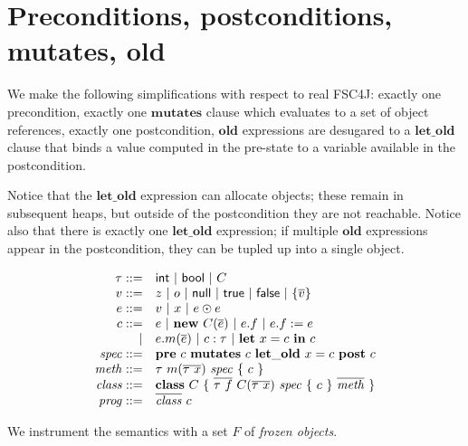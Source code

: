 \documentclass{article}
\newcommand{\op}{\odot}
\begin{document}
\section{Preconditions, postconditions, mutates, old}

We make the following simplifications with respect to real FSC4J: exactly one precondition, exactly one $\mathbf{mutates}$ clause which evaluates to a set of object references, exactly one postcondition, $\mathbf{old}$ expressions are desugared to a $\mathbf{let\_old}$ clause that binds a value computed in the pre-state to a variable available in the postcondition.

Notice that the $\mathbf{let\_old}$ expression can allocate objects; these remain in subsequent heaps, but outside of the postcondition they are not reachable. Notice also that there is exactly one $\mathbf{let\_old}$ expression; if multiple $\mathbf{old}$ expressions appear in the postcondition, they can be tupled up into a single object.

$$\begin{array}{r l}
\tau ::= & \mathsf{int}\ |\ \mathsf{bool}\ |\ C\\
v ::= & z\ |\ o\ |\ \mathsf{null}\ |\ \mathsf{true}\ |\ \mathsf{false}\ |\ \{\overline{v}\}\\
e ::= & v\ |\ x\ |\ e \op e\\
c ::= & e\ |\ \mathbf{new}\ C(\overline{e})\ |\ e.f\ |\ e.f := e\\
| & e.m(\overline{e})\ |\ c : \tau\ |\ \mathbf{let}\ x = c\ \mathbf{in}\ c\\
\mathit{spec} ::= & \mathbf{pre}\ c\ \mathbf{mutates}\ c\ \mathbf{let\_old}\ x = c\ \mathbf{post}\ c\\
\mathit{meth} ::= & \tau\ m(\overline{\tau\ x})\ \mathit{spec}\ \{\ c\ \}\\
\mathit{class} ::= & \mathbf{class}\ C\ \{\ \overline{\tau\ f}\ C(\overline{\tau\ x})\ \mathit{spec}\ \{\ c\ \}\ \overline{\mathit{meth}}\ \}\\
\mathit{prog} ::= & \overline{\mathit{class}}\ c
\end{array}$$

We instrument the semantics with a set $F$ of \emph{frozen objects}.
\end{document}

